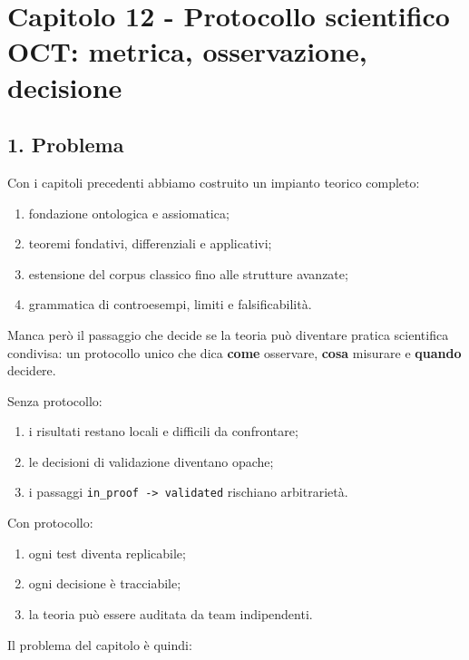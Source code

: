\chapter{Capitolo 12 - Protocollo scientifico OCT: metrica, osservazione, decisione}

\section{1. Problema}

Con i capitoli precedenti abbiamo costruito un impianto teorico completo:

\begin{enumerate}
\def\labelenumi{\arabic{enumi}.}
\tightlist
\item
  fondazione ontologica e assiomatica;
\item
  teoremi fondativi, differenziali e applicativi;
\item
  estensione del corpus classico fino alle strutture avanzate;
\item
  grammatica di controesempi, limiti e falsificabilità.
\end{enumerate}

Manca però il passaggio che decide se la teoria può diventare pratica scientifica condivisa: un protocollo unico che dica \textbf{come} osservare, \textbf{cosa} misurare e \textbf{quando} decidere.

Senza protocollo:

\begin{enumerate}
\def\labelenumi{\arabic{enumi}.}
\tightlist
\item
  i risultati restano locali e difficili da confrontare;
\item
  le decisioni di validazione diventano opache;
\item
  i passaggi \texttt{in\_proof\ -\textgreater{}\ validated} rischiano arbitrarietà.
\end{enumerate}

Con protocollo:

\begin{enumerate}
\def\labelenumi{\arabic{enumi}.}
\tightlist
\item
  ogni test diventa replicabile;
\item
  ogni decisione è tracciabile;
\item
  la teoria può essere auditata da team indipendenti.
\end{enumerate}

Il problema del capitolo è quindi:

